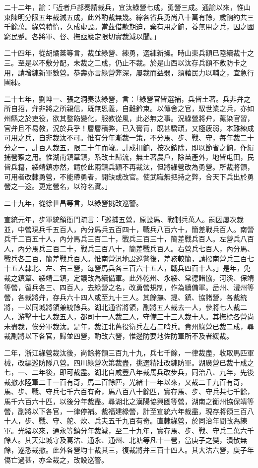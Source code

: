 \begin{pinyinscope}
二十二年，諭：「近者戶部奏請裁兵，宜汰綠營七成，勇營三成。通諭以來，惟山東陳明分限五年裁減五成，此外酌裁無幾。綜各省兵勇尚八十萬有餘，歲餉約共三千餘萬。綠營積惰，久成虛設。當茲借款期迫，棄有用之餉，養無用之兵，因之國窮民蹙。各將軍、督、撫亟應定限切實裁減以聞。」

二十四年，從胡燏棻等言，裁並綠營、練勇，選練新操。時山東兵額已陸續裁十之三。至是以不敷分配，未裁之二成，仍止不裁。於是山西以汰存兵額不敷防卡之用，請增練新軍數營。恭壽亦言綠營弊深，屢裁而益弱，須藉民力以輔之，宜急行團練。

二十七年，劉坤一、張之洞奏汰綠營，言：「綠營官皆選補，兵皆土著。兵非弁之所自招，弁非將之所親信，既無恩義，自難鈐束。以傳舍之官，馭世業之兵，亦如州縣之於吏役，欲其整飭變化，服教從風，此必無之事。況綠營將弁，薰染官習，官弁且不易教，況於兵乎！層層積弊，已入膏肓，既甚驕頑，又極疲弱，本難練成可用之兵，自非裁汰不可。惟有分年漸裁一策，不分馬、步、戰、守，每年裁二十分之一，計百人裁五，限二十年而竣。計成扣餉，按次銷除，即以節省之餉，作緝捕營察之用。惟湖南鎮筸鎮，系改土歸流，無土著農戶，除苗產外，地皆屯田，民皆兵籍，綏靖鎮亦然，請於此兩鎮兵額不再裁汰，但將綠營改為勇營。所裁將領，可用者改隸勇營，不能帶勇者，開缺或改官。使武職無把持之弊，合天下兵出於勇營之一途。更定營名，以符名實。」

二十九年，從徐世昌等言，以綠營挑改巡警。

宣統元年，步軍統領衙門疏言：「巡捕五營，原設馬、戰制兵萬人。嗣因屢次裁並，中營現兵千五百人，內分馬兵五百四十，戰兵八百六十，簡差戰兵百人。南營兵千二百五十人，內分馬兵三百二十，戰兵三百三十，簡差戰兵百人。左營兵八百人，內分馬兵三百二十，戰兵三百八十，簡差戰兵百人。右營兵七百人，內分馬、戰兵各三百，簡差戰兵百人。惟南營汛地設巡警後，差務較簡，請撥南營兵三百七十五人隸北、左、右三營，每營馬兵各三百六十五人，戰兵四百十人。」是年，免裁之鎮筸、綏靖二鎮，定議改為續備軍。此外乾州、永綏、常德諸協，河溪、保靖等營，留兵各三、四百人，去綠營之名，改勇營規制，作為續備軍。岳州、澧州等營，各裁將弁，存兵六十四人或至九十三人。其餘撫、提、鎮、協諸營，各裁統將，一以同城將領兼統餘兵。湖北通省將領，副將五人裁去一人，參將七人裁二人，游擊十七人裁五人，都司十一人裁三人，守備三十三人裁十人。其撫標各營尚未盡裁，俟分軍裁汰。是年，裁江北舊役衛兵左右二哨兵。貴州綠營已裁二成，尋裁副將以下各官，歸並四營，酌改六營，惟邊防要地佐防軍所不及者緩裁。

二年，浙江綠營裁汰後，尚餘將領三百九十九，兵七千餘，一律裁盡，收取馬匹軍械，改編巡防隊八營。四川綠營次第裁盡，挑選精壯改練防軍。湖廣營已裁十成之七，一、二年後，即可裁盡。湖北自咸豐八年裁馬兵改步兵，同治八、九年，先後裁撤水陸軍二千一百有奇，馬二百餘匹，光緒十一年以來，又裁二千九百有奇，馬、步、戰、守兵七千六百有奇，馬八百八十餘匹，實存馬、步、守兵共七千餘，馬千六百六十匹，以後分年裁盡。尋湖北之漢陽協興國等營，湖南之衡州協保靖等營，副將以下各官，一律停補。裁福建綠營，計至宣統六年裁盡，現存將領三百八十人，步、戰、守、舵、炊、兵夫五千九百有奇。直隸綠營，於同治年間改為練軍。光緒以來，通永等鎮分年裁減，至二十九年，實存馬、步、戰、守兵二萬六千餘人。其天津城守及葛沽、通永、通州、北塘等凡十一營，當庚子之變，潰散無餘，遂悉裁撤。此外各營均十裁其三，復裁將弁三百十四人。其大沽六營，庚子年傷亡過甚，亦全裁之，改設巡警。


\end{pinyinscope}
